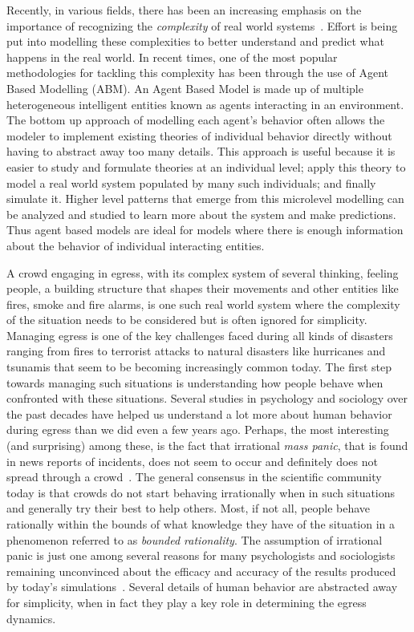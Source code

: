 Recently, in various fields, there has been an increasing emphasis on the importance of recognizing the \emph{complexity} of real world systems~\cite{Arthur:2010uy}. Effort is being put into modelling these complexities to better understand and predict what happens in the real world. In recent times, one of the most popular methodologies for tackling this complexity has been through the use of Agent Based Modelling (ABM). An Agent Based Model is made up of multiple heterogeneous intelligent entities known as agents interacting in an environment. The bottom up approach of modelling each agent's behavior often allows the modeler to implement existing theories of individual behavior directly without having to abstract away too many details. This approach is useful because it is easier to study and formulate theories at an individual level; apply this theory to model a real world system populated by many such individuals; and finally simulate it. Higher level patterns that emerge from this microlevel modelling can be analyzed and studied to learn more about the system and make predictions. Thus agent based models are ideal for models where there is enough information about the behavior of individual interacting entities.


A crowd engaging in egress, with its complex system of several thinking, feeling people, a building structure that shapes their movements and other entities like fires, smoke and fire alarms,  is one such real world system where the complexity of the situation needs to be considered but is often ignored for simplicity.  Managing egress is one of the key challenges faced during all kinds of disasters ranging from fires to terrorist attacks to natural disasters like hurricanes and tsunamis that seem to be becoming increasingly common today. The first step towards managing such situations is understanding how people behave when confronted with these situations. Several studies in psychology and sociology over the past decades have helped us understand a lot more about human behavior during egress than we did even a few years ago. Perhaps, the most interesting (and surprising) among these, is the fact that irrational \emph{mass panic}, that is found in news reports of incidents, does not seem to occur and definitely does not spread through a crowd~\cite{Kobes:2009jx,Schadschneider:2008cz,Reicher:2008ep,Torres:2010tj,Paulsen:1984ti,Sime:1983uy}. The general consensus in the scientific community today is that crowds do not start behaving irrationally when in such situations and generally try their best to help others. Most, if not all, people behave rationally within the bounds of what knowledge they have of the situation in a phenomenon referred to as \emph{bounded rationality}. The assumption of irrational panic is just one among several reasons for many psychologists and sociologists remaining unconvinced about the efficacy and accuracy of the results produced by today's simulations~\cite{Aguirre:2004tn,Torres:2010tj,Sime:1995uu}. Several details of human behavior are  abstracted away for simplicity, when in fact they play a key role in determining the egress dynamics.

